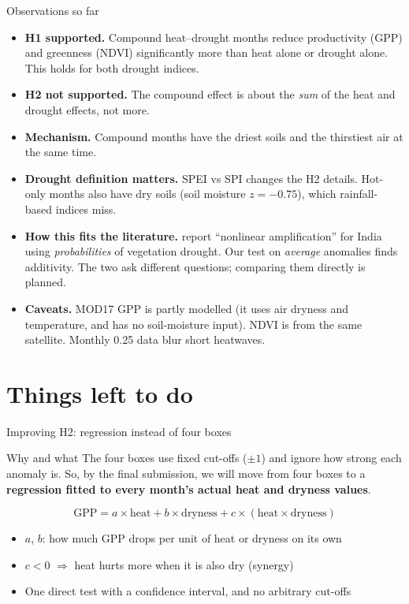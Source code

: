 \documentclass[11pt,aspectratio=169]{beamer}
\begin{document}
\begin{frame}{Observations so far}
  \small
  \begin{itemize}
    \item \textbf{H1 supported.} Compound heat--drought months reduce
      productivity (GPP) and greenness (NDVI) significantly more than heat
      alone or drought alone. This holds for both drought indices.
    \item \textbf{H2 not supported.} The compound effect is about the
      \emph{sum} of the heat and drought effects, not more.
    \item \textbf{Mechanism.} Compound months have the driest soils and the
      thirstiest air at the same time.
    \item \textbf{Drought definition matters.} SPEI vs SPI changes the H2
      details. Hot-only months also have dry soils (soil moisture
      $z = -0.75$), which rainfall-based indices miss.
    \item \textbf{How this fits the literature.} \citet{meena2026} report
      ``nonlinear amplification'' for India using \emph{probabilities} of
      vegetation drought. Our test on \emph{average} anomalies finds
      additivity. The two ask different questions; comparing them directly
      is planned.
    \item \textbf{Caveats.} MOD17 GPP is partly modelled (it uses air
      dryness and temperature, and has no soil-moisture input). NDVI is from
      the same satellite. Monthly 0.25\textdegree{} data blur short
      heatwaves.
  \end{itemize}
\end{frame}

\section{Things left to do}

\begin{frame}{Improving H2: regression instead of four boxes}
  \begin{block}{Why and what}
    The four boxes use fixed cut-offs ($\pm1$) and ignore how strong each
    anomaly is. So, by the final submission, we will move from four boxes to a
    \textbf{regression fitted to every month's actual heat and dryness values}.
  \end{block}
  \[
    \text{GPP} = a \times \text{heat} + b \times \text{dryness}
      + c \times (\text{heat} \times \text{dryness})
  \]
  \begin{itemize}
    \item $a$, $b$: how much GPP drops per unit of heat or dryness on its own
    \item $c < 0$ $\Rightarrow$ heat hurts more when it is also dry (synergy)
    \item One direct test with a confidence interval, and no arbitrary cut-offs
  \end{itemize}
\end{frame}
\end{document}
